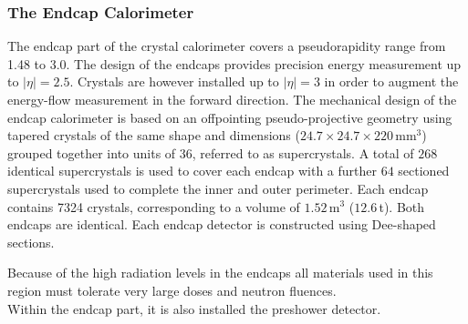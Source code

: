 \subsubsection{The Endcap Calorimeter}
The endcap part of the crystal calorimeter covers a pseudorapidity range from 1.48 to 3.0. The design of the endcaps provides precision energy measurement up to $|\eta| = 2.5$. Crystals are however installed up to $|\eta| = 3$ in order to augment the energy-flow measurement in the forward direction.  The mechanical design of the endcap calorimeter is based on an offpointing pseudo-projective geometry using tapered crystals of the same shape and dimensions ($24.7 \times 24.7 \times 220 \,$mm$^3$) grouped together into units of $36$, referred to as supercrystals. A total of $268$ identical supercrystals is used to cover each endcap with a further $64$ sectioned supercrystals used to complete the inner and outer perimeter. Each endcap contains 7324 crystals, corresponding to a volume of $1.52 \,$m$^3$ ($12.6 \,$t). Both endcaps are identical. Each endcap detector is constructed using Dee-shaped sections.

Because of the high radiation levels in the endcaps all materials used in this region must tolerate very large doses and neutron fluences.  \\
Within the endcap part, it is also installed the preshower detector. 


